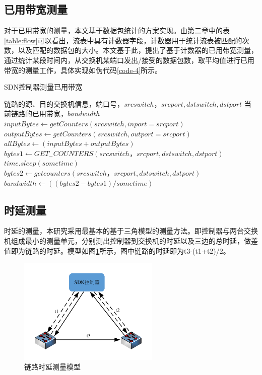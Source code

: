 \subsection{已用带宽测量}
对于已用带宽的测量，本文基于数据包统计的方案实现。由第二章中的表\ref{table:flow}可以看出，流表中具有计数器字段，计数器用于统计流表被匹配的次数，以及匹配的数据包的大小。本文基于此，提出了基于计数器的已用带宽测量，通过统计某段时间内，从交换机某端口发出/接受的数据包数，取平均值进行已用带宽的测量工作，具体实现如伪代码\ref{code-4}所示。

\begin{algorithm}[!htb]
    \caption{SDN控制器测量已用带宽}
    \label{code-4}
    \begin{algorithmic}[1] %
        \Require 链路的源、目的交换机信息，端口号，$srcswitch，srcport,dstswitch,dstport$
        \Ensure 当前链路的已用带宽，$bandwidth$
        	\State $inputBytes \gets getCounters(srcswitch, inport=srcport)$
        	\State $outputBytes \gets getCounters(srcswitch, outport=srcport)$
        	\State $allBytes \gets (inputBytes+outputBytes)$
        	\State {}
        \EndFunction
        	\State $bytes1 \gets GET_{-}COUNTERS(srcswitch，srcport, dstswitch,dstport)$
        	\State $time.sleep(sometime)$
        	\State $bytes2 \gets getcounters(srcswitch，srcport, dstswitch,dstport)$
        	\State $bandwidth \gets ((bytes2-bytes1)/sometime)$
         	\State {}
        \EndFunction
    \end{algorithmic}
\end{algorithm}
\subsection{时延测量}
时延的测量，本研究采用最基本的基于三角模型的测量方法。即控制器与两台交换机组成最小的测量单元，分别测出控制器到交换机的时延以及三边的总时延，做差值即为链路的时延。模型如图\ref{fig:delay}所示，图中链路的时延即为t3-(t1+t2)/2。

\begin{figure}[!htb]
  \centering
  \includegraphics[width=0.6\textwidth]{logo/delay}
  \caption{链路时延测量模型}
  \label{fig:delay}
\end{figure}

